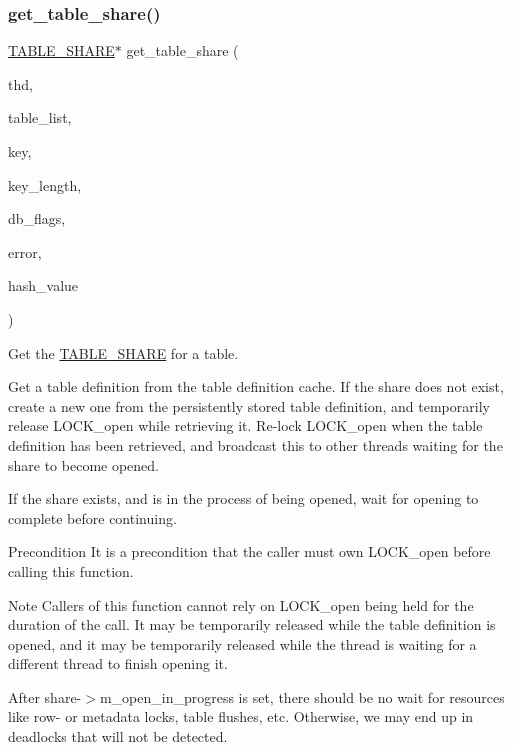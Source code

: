 \subsubsection{\texorpdfstring{get\+\_\+table\+\_\+share()}{get\_table\_share()}}
{\footnotesize\ttfamily \mbox{\hyperlink{structTABLE__SHARE}{T\+A\+B\+L\+E\+\_\+\+S\+H\+A\+RE}}$\ast$ get\+\_\+table\+\_\+share (\begin{DoxyParamCaption}\item[{T\+HD $\ast$}]{thd,  }\item[{\mbox{\hyperlink{structTABLE__LIST}{T\+A\+B\+L\+E\+\_\+\+L\+I\+ST}} $\ast$}]{table\+\_\+list,  }\item[{const char $\ast$}]{key,  }\item[{size\+\_\+t}]{key\+\_\+length,  }\item[{uint}]{db\+\_\+flags,  }\item[{int $\ast$}]{error,  }\item[{my\+\_\+hash\+\_\+value\+\_\+type}]{hash\+\_\+value }\end{DoxyParamCaption})}

Get the \mbox{\hyperlink{structTABLE__SHARE}{T\+A\+B\+L\+E\+\_\+\+S\+H\+A\+RE}} for a table.

Get a table definition from the table definition cache. If the share does not exist, create a new one from the persistently stored table definition, and temporarily release L\+O\+C\+K\+\_\+open while retrieving it. Re-\/lock L\+O\+C\+K\+\_\+open when the table definition has been retrieved, and broadcast this to other threads waiting for the share to become opened.

If the share exists, and is in the process of being opened, wait for opening to complete before continuing.

\begin{DoxyPrecond}{Precondition}
It is a precondition that the caller must own L\+O\+C\+K\+\_\+open before calling this function.
\end{DoxyPrecond}
\begin{DoxyNote}{Note}
Callers of this function cannot rely on L\+O\+C\+K\+\_\+open being held for the duration of the call. It may be temporarily released while the table definition is opened, and it may be temporarily released while the thread is waiting for a different thread to finish opening it.

After share-\/$>$m\+\_\+open\+\_\+in\+\_\+progress is set, there should be no wait for resources like row-\/ or metadata locks, table flushes, etc. Otherwise, we may end up in deadlocks that will not be detected.
\end{DoxyNote}


